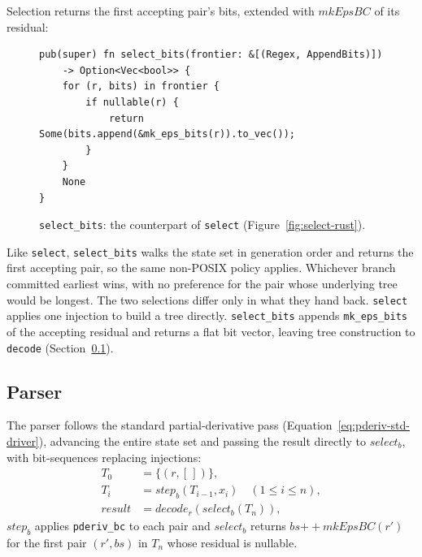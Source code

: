 \clearpage
Selection returns the first accepting pair's bits, extended with
$\mathit{mkEpsBC}$ of its residual:
\begin{figure}[H]
\small
\begin{verbatim}
pub(super) fn select_bits(frontier: &[(Regex, AppendBits)]) 
    -> Option<Vec<bool>> {
    for (r, bits) in frontier {
        if nullable(r) {
            return Some(bits.append(&mk_eps_bits(r)).to_vec());
        }
    }
    None
}
\end{verbatim}
\caption{\texttt{select\_bits}: the counterpart of
\texttt{select} (Figure~\ref{fig:select-rust}).}
\label{fig:select-bits-rust}
\end{figure}

Like \texttt{select}, \texttt{select\_bits} walks the state set 
in generation order and returns the first accepting pair, 
so the same non-POSIX policy applies.
Whichever branch committed earliest wins, with
no preference for the pair whose underlying tree would be longest.
The two selections differ only in what they hand back.
\texttt{select} applies one injection to build a tree directly.
\texttt{select\_bits} appends \texttt{mk\_eps\_bits} 
of the accepting residual and returns a flat bit vector, 
leaving tree construction to \texttt{decode} 
(Section~\ref{sec:pderiv-bc-parser}).

%
%
%

\subsection{Parser}
\label{sec:pderiv-bc-parser}

The parser follows the standard partial-derivative pass
(Equation~\eqref{eq:pderiv-std-driver}),
advancing the entire state set and passing the result
directly to $\mathit{select}_b$, with bit-sequences
replacing injections:
\begin{equation}\label{eq:pderiv-bc-driver}
\begin{aligned}
T_0 &= \{(r, [\,])\}, \\
T_i &= \mathit{step}_b(T_{i-1}, x_i) \quad (1 \leq i \leq n), \\
\mathit{result} &= \mathit{decode}_r(\mathit{select}_b(T_n)),
\end{aligned}
\end{equation}
$\mathit{step}_b$ applies \texttt{pderiv\_bc} to each pair 
and $\mathit{select}_b$ returns $bs \mathbin{+\!\!+} \mathit{mkEpsBC}(r')$
for the first pair $(r', bs)$ in $T_n$ whose residual is nullable.

